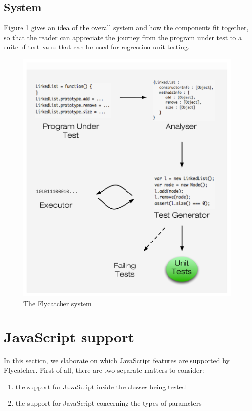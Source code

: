 \subsection{System}
Figure \ref{system} gives an idea of the overall system and how the components fit together, so that the reader can appreciate the journey from the program under test to a suite of test cases that can be used for regression unit testing.

\begin{figure}[h]
\centering
\includegraphics[scale=0.55]{./components/chapter3/system10.pdf}
\caption{The \textsf{Flycatcher} system}
\label{system}
\end{figure}

\section{JavaScript support}
In this section, we elaborate on which JavaScript features are supported by \textsf{Flycatcher}. First of all, there are two separate matters to consider:

\begin{enumerate}
   \item the support for JavaScript inside the classes being tested
   \item the support for JavaScript concerning the types of parameters
\end{enumerate}

